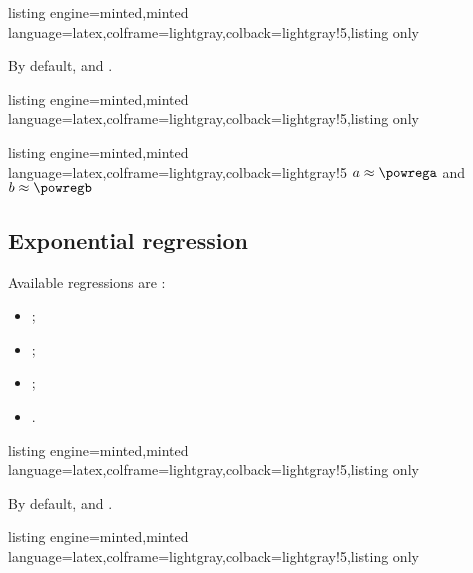 \documentclass[11pt,a4paper]{ltxdoc}
\begin{document}
\begin{tcblisting}{listing engine=minted,minted language=latex,colframe=lightgray,colback=lightgray!5,listing only}
\end{tcblisting}

By default,  and .

\begin{tcblisting}{listing engine=minted,minted language=latex,colframe=lightgray,colback=lightgray!5,listing only}
\def\LLX{83,71,64,69,69,64,68,59,81,91,57,65,58,62}%
\def\LLY{183,168,171,178,176,172,165,158,183,182,163,175,164,175}%
\end{tcblisting}

\begin{tcblisting}{listing engine=minted,minted language=latex,colframe=lightgray,colback=lightgray!5}
\xintpowreg{\LLX}{\LLY}%
$a \approx \powrega$ and $b \approx \powregb$
\end{tcblisting}

\subsection{Exponential regression}

Available regressions are :

\begin{itemize}
	\item {} ;
	\item {} ;
	\item {} ;
	\item {}.
\end{itemize}

\begin{tcblisting}{listing engine=minted,minted language=latex,colframe=lightgray,colback=lightgray!5,listing only}
\end{tcblisting}

By default,  and .

\smallskip

\begin{tcblisting}{listing engine=minted,minted language=latex,colframe=lightgray,colback=lightgray!5,listing only}
\end{tcblisting}
\end{document}
